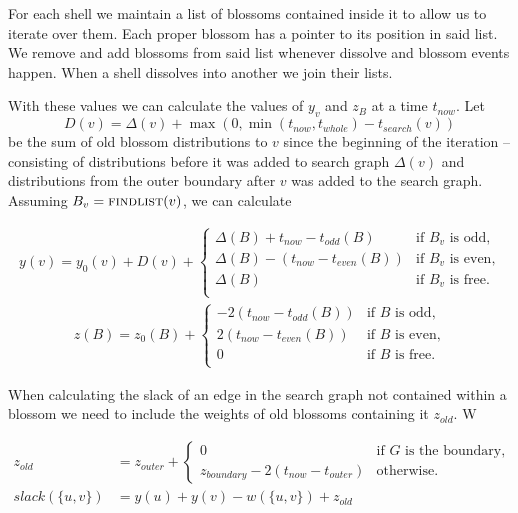 For each shell we maintain a list of blossoms contained inside it to allow us to iterate over them. Each proper blossom has a pointer to its position in said list. We remove and add blossoms from said list whenever dissolve and blossom events happen. When a shell dissolves into another we join their lists.

With these values we can calculate the values of $y_v$ and $z_B$ at a time $t_{now}$. Let 
\[ D(v) = \Delta(v) + \max(0, \min(t_{now}, t_{whole}) - t_{search}(v)) \] 
be the sum of old blossom distributions to $v$ since the beginning of the iteration – consisting of distributions before it was added to search graph $\Delta(v)$ and distributions from the outer boundary after $v$ was added to the search graph. Assuming $B_v = \textsc{findlist}(v)$, we can calculate

\begin{align*}
    y(v) = y_0(v) + D(v) + 
    \begin{cases}
        \Delta(B) + t_{now} - t_{odd}(B) & \text{if $B_v$ is odd,} \\
        \Delta(B) - (t_{now} - t_{even}(B)) & \text{if $B_v$ is even,} \\
        \Delta(B) & \text{if $B_v$ is free.} \\
    \end{cases}
\end{align*}
\begin{align*}
    z(B) = z_0(B) + 
    \begin{cases}
        -2(t_{now} - t_{odd}(B)) & \text{if $B$ is odd,} \\
        2(t_{now} - t_{even}(B)) & \text{if $B$ is even,} \\
        0 & \text{if $B$ is free.} \\
    \end{cases}
\end{align*}

When calculating the slack of an edge in the search graph not contained within a blossom we need to include the weights of old blossoms containing it $z_{old}$. W

\begin{align*}
    z_{old} &= z_{outer} + \begin{cases}
        0 & \text{if $G$ is the boundary,} \\
        z_{boundary} - 2(t_{now} - t_{outer}) & \text{otherwise.}
    \end{cases} \\
    slack(\{u, v\}) &= y(u) + y(v) - w(\{u, v\}) + z_{old}
\end{align*}

